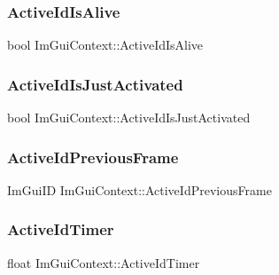 \hypertarget{struct_im_gui_context_a3b28802a3a394f032264d36d5a5a00e0}{}\label{struct_im_gui_context_a3b28802a3a394f032264d36d5a5a00e0} 
\subsubsection{\texorpdfstring{Active\+Id\+Is\+Alive}{ActiveIdIsAlive}}
{\footnotesize\ttfamily bool Im\+Gui\+Context\+::\+Active\+Id\+Is\+Alive}

\hypertarget{struct_im_gui_context_aa539096bf2b0ab28e0dbf73d595c64d8}{}\label{struct_im_gui_context_aa539096bf2b0ab28e0dbf73d595c64d8} 
\subsubsection{\texorpdfstring{Active\+Id\+Is\+Just\+Activated}{ActiveIdIsJustActivated}}
{\footnotesize\ttfamily bool Im\+Gui\+Context\+::\+Active\+Id\+Is\+Just\+Activated}

\hypertarget{struct_im_gui_context_af58aa479f6c97819694f1709b62c70d8}{}\label{struct_im_gui_context_af58aa479f6c97819694f1709b62c70d8} 
\subsubsection{\texorpdfstring{Active\+Id\+Previous\+Frame}{ActiveIdPreviousFrame}}
{\footnotesize\ttfamily Im\+Gui\+ID Im\+Gui\+Context\+::\+Active\+Id\+Previous\+Frame}

\hypertarget{struct_im_gui_context_a9deb2b22abfb5a4fd306371b19e2b9c4}{}\label{struct_im_gui_context_a9deb2b22abfb5a4fd306371b19e2b9c4} 
\subsubsection{\texorpdfstring{Active\+Id\+Timer}{ActiveIdTimer}}
{\footnotesize\ttfamily float Im\+Gui\+Context\+::\+Active\+Id\+Timer}


